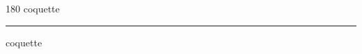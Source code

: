 
\begin{frame}
\begin{center}
\begin{turn}{180}
{\fontsize{2.5cm}{1em}\selectfont coquette}
\end{turn}
\vspace{1em}\par  
\hrule
\vspace{1em}\par  
{\fontsize{2.5cm}{1em}\selectfont coquette}
\end{center}
\end{frame}

